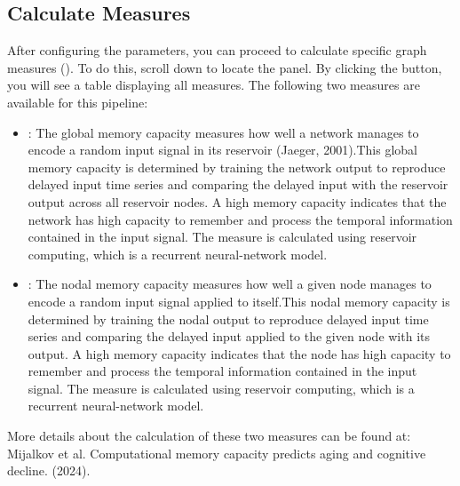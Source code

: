 \documentclass[justified]{tufte-handout}
\begin{document}
\clearpage
\subsection{Calculate Measures}
After configuring the parameters, you can proceed to calculate specific graph measures (). To do this, scroll down to locate the  panel. By clicking the  button, you will see a table displaying all measures. The following two measures are available for this pipeline:

\begin{itemize}
	
	\item {}: The global memory capacity measures how well a network manages to encode a random input signal in its reservoir (Jaeger, 2001).This global memory capacity is determined by training the network output to reproduce delayed input time series and comparing the delayed input with the reservoir output across all reservoir nodes. A high memory capacity indicates that the network has high capacity to remember and process the temporal information contained in the input signal. The measure is calculated using reservoir computing, which is a recurrent neural-network model.
	
	\item {}:	The nodal memory capacity measures how well a given node manages to encode a random input signal applied to itself.This nodal memory capacity is determined by training the nodal output to reproduce delayed input time series  and comparing the delayed input applied to the given node with its output.  A high memory capacity indicates that the node has high capacity to remember and process the temporal  information contained in the input signal. The measure is calculated using reservoir computing, which is a recurrent neural-network model.
	
\end{itemize}

 More details about the calculation of these two measures can be found at: Mijalkov et al. Computational memory capacity predicts aging and cognitive decline. (2024).
\end{document}
